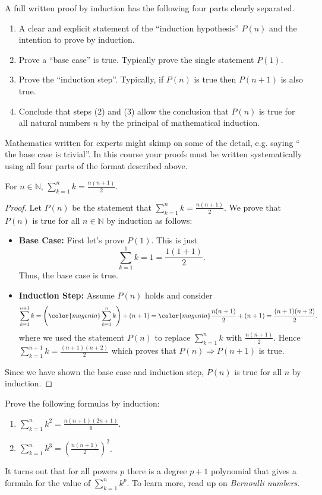\documentclass[11pt,dvipsnames]{book}
\numberwithin{figure}{section} %
\numberwithin{table}{section} %
\begin{document}
A full written proof by induction has the following four parts clearly separated.
\begin{enumerate}
	\item A clear and explicit statement of the ``induction hypothesis'' $P(n)$ and the intention to prove by induction.
	\item Prove a ``base case'' is true. Typically prove the single statement $P(1)$.
	\item Prove the ``induction step''.  Typically, if $P(n)$ is true then $P(n+1)$ is also true.
	\item Conclude that steps (2) and (3) allow the conclusion that $P(n)$ is true for all natural numbers $n$ by the principal of mathematical induction.
\end{enumerate}
Mathematics written for experts might skimp on some of the detail, e.g. saying `` the base case is trivial''. In this course your proofs must be written systematically using all four parts of the format described above.

\begin{example}
For $n\in\mathbb{N}$, $\sum_{k=1}^{n}k=\frac{n(n+1)}{2}$.

\begin{proof}
Let $P(n)$ be the statement that $\sum_{k=1}^{n}k=\frac{n(n+1)}{2}$. We prove that $P(n)$ is true for all $n\in\mathbb{N}$ by induction as follows:\\

\begin{itemize}
\item  {\bf Base Case:} First let's prove $P(1)$. This is just
\[
\sum_{k=1}^{1}k=1=\frac{1(1+1)}{2}.
\]
Thus, the base case is true. \\

\item  {\bf Induction Step:} Assume $P(n)$ holds and consider
\[
\sum_{k=1}^{n+1}k =\left({\color{magenta} \sum_{k=1}^{n} k}\right) + (n+1)  = {\color{magenta} \frac{n(n+1)}{2}} +(n+1) = \frac{(n+1)(n+2)}{2}.
\]
where we used the statement $P(n)$ to replace \(\sum_{k=1}^{n} k\) with \(\frac{n(n+1)}{2} \).
Hence \(\sum_{k=1}^{n+1}k=\frac{(n+1)(n+2)}{2}\) which proves that
$P(n)\Rightarrow P(n+1)$ is true.
\end{itemize}
Since we have shown the base case and induction step, $P(n)$ is true for all $n$ by induction.
\end{proof}
\end{example}

\begin{exercise}
Prove the following formulas by induction:
\begin{enumerate}[label=(\alph*)]
\item $\sum_{k=1}^{n} k^{2} = \frac{n(n+1)(2n+1)}{6}$.
\item $\sum_{k=1}^{n} k^{3}  = \left(\frac{n(n+1)}{2}\right)^{2}$.
\end{enumerate}
It turns out that for all powers $p$ there is a degree $p+1$ polynomial that gives a formula for the value of $\sum_{k=1}^{n} k^{p}$. To learn more, read up on {\it Bernoulli numbers}.
\end{exercise}
\end{document}

